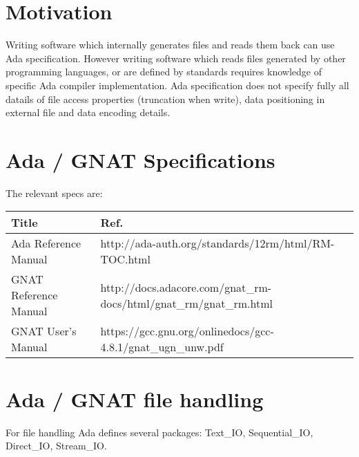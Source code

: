 \documentclass[a4paper,10pt]{article}
\begin{document}
\tableofcontents

\section{Motivation}

Writing software which internally generates files and reads them back can use
Ada specification. However writing software which reads files generated by other
programming languages, or are defined by standards requires knowledge of specific Ada compiler
implementation. Ada specification does not specify fully all datails of file access properties 
(truncation when write), data positioning in external file and data encoding details.

\section{Ada / GNAT Specifications}
\label{sec:adagnatdocs}

The relevant specs are:

\begin{tabular}{ l l  }
 Title                               &  Ref.                                                \\
\hline
 Ada Reference Manual                &  http://ada-auth.org/standards/12rm/html/RM-TOC.html \\
 GNAT Reference Manual               &  http://docs.adacore.com/gnat\_rm-docs/html/gnat\_rm/gnat\_rm.html \\
 GNAT User's Manual                  &  https://gcc.gnu.org/onlinedocs/gcc-4.8.1/gnat\_ugn\_unw.pdf \\
\end{tabular}


\section{Ada / GNAT file handling}
\label{sec:adagnatfilehandling}

For file handling Ada defines several packages: Text\_IO, Sequential\_IO, Direct\_IO, Stream\_IO.
\end{document}
